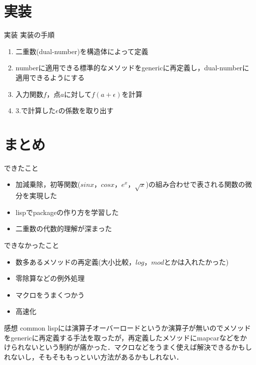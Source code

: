 \documentclass[11pt,xcolor=dvipsnames,table,dvipdfmx]{beamer}
\begin{document}
\section{実装}
\begin{frame}{実装}
 実装の手順
 \begin{enumerate}
  \item 二重数(dual-number)を構造体によって定義
  \item numberに適用できる標準的なメソッドをgenericに再定義し，dual-numberに適用できるようにする
  \item 入力関数$f$，点$a$に対して$f(a + \epsilon)$を計算
  \item 3.で計算した$\epsilon$の係数を取り出す
 \end{enumerate}
\end{frame}


\section{まとめ}
\begin{frame}{できたこと}
  \begin{itemize}
   \item 加減乗除，初等関数($sin x$，$cos x$，$e^x$，$\sqrt{x}$)の組み合わせで表される関数の微分を実現した
   \item lispでpackageの作り方を学習した
   \item 二重数の代数的理解が深まった
  \end{itemize}
\end{frame}

\begin{frame}{できなかったこと}
 \begin{itemize}
  \item 数多あるメソッドの再定義(大小比較，$log$，$mod$とかは入れたかった)
  \item 零除算などの例外処理
  \item マクロをうまくつかう
  \item 高速化
 \end{itemize}
\end{frame}

\begin{frame}{感想}
 common lispには演算子オーバーロードというか演算子が無いのでメソッドをgenericに再定義する手法を取ったが，再定義したメソッドにmapcarなどをかけられないという制約が痛かった．マクロなどをうまく使えば解決できるかもしれないし，そもそももっといい方法があるかもしれない．
\end{frame}
\end{document}

